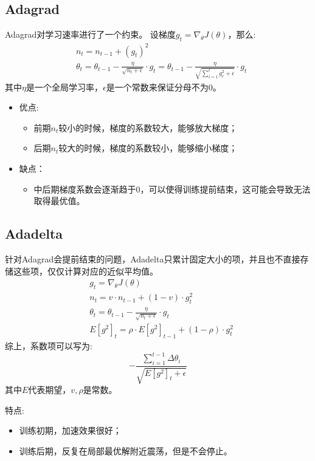 \documentclass[11pt]{report}
\begin{document}
\subsection{Adagrad}
Adagrad对学习速率进行了一个约束。
设梯度$g_t=\nabla_\theta J(\theta)$，那么:
\begin{equation}
	\begin{split}
		& n_t=n_{t-1}+(g_t)^2\\
		& \theta_t=\theta_{t-1}-\frac{\eta}{\sqrt{n_t+\epsilon}}\cdot g_t=\theta_{t-1}-\frac{\eta}{\sqrt{\sum_{i=1}^tg_r^2+\epsilon}}\cdot g_t
	\end{split}
\end{equation}
其中$\eta$是一个全局学习率，$\epsilon$是一个常数来保证分母不为0。
\begin{itemize}
	\item 优点:
		\begin{itemize}
			\item 前期$n_t$较小的时候，梯度的系数较大，能够放大梯度；
			\item 后期$n_t$较大的时候，梯度的系数较小，能够缩小梯度；
		\end{itemize}
	\item 缺点：
		\begin{itemize}
			\item 中后期梯度系数会逐渐趋于0，可以使得训练提前结束，这可能会导致无法取得最优值。
		\end{itemize}
\end{itemize}
\subsection{Adadelta}
针对Adagrad会提前结束的问题，Adadelta只累计固定大小的项，并且也不直接存储这些项，仅仅计算对应的近似平均值。
\begin{equation}
\begin{split}
	& g_t=\nabla_\theta J(\theta)\\
	& n_t=v\cdot n_{t-1}+(1-v)\cdot g_t^2\\
	& \theta_t=\theta_{t-1}-\frac{\eta}{\sqrt{n_t+\epsilon}}\cdot g_t\\
	& E[g^2]_t=\rho\cdot E[g^2]_{t-1}+(1-\rho)\cdot g_t^2
\end{split}
\end{equation}
综上，系数项可以写为:
\begin{equation}
	-\frac{\sum_{i=1}^{t-1}\Delta\theta_i}{\sqrt{E[g^2]_t+\epsilon}}
\end{equation}
其中$E$代表期望，$v,\rho$是常数。
\par
特点:
\begin{itemize}
	\item 训练初期，加速效果很好；
	\item 训练后期，反复在局部最优解附近震荡，但是不会停止。
\end{itemize}
\end{document}
